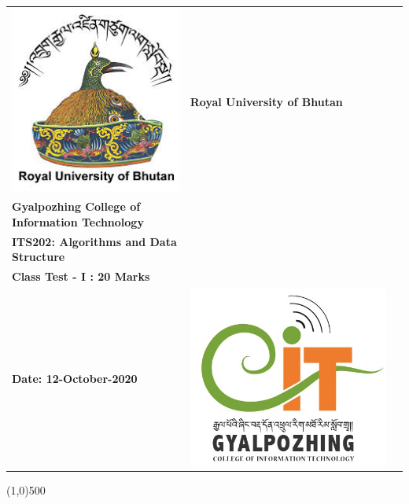 \documentclass[12pt,a4paper]{article}
\author{Sonam Wangmo}
\begin{document}
	 \begin{center}
		\setlength{\tabcolsep}{0pt}
		\begin{tabular}{>{\raggedleft}m{3cm}>{\centering}m{\dimexpr\textwidth - 5cm\relax}>{\raggedright}m{3.5cm}}
			\includegraphics[width=\linewidth]{1}%
			&%
			\textbf{Royal University of Bhutan} \\ 
			\textbf{Gyalpozhing College of Information Technology} \\
			\textbf{ITS202: Algorithms and Data Structure} \\
			\textbf{Class Test - I : 20 Marks} \\
			\textbf{Date: 12-October-2020}
			&%
			\includegraphics[width=\linewidth]{2} %
		\end{tabular}
	\line(1,0){500}
	\end{center}
	
\end{document}
